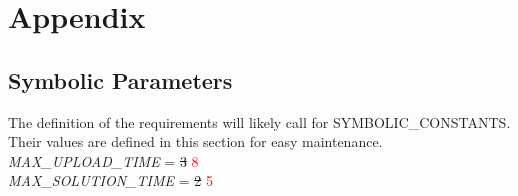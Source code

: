 \documentclass[11pt]{article}
\begin{document}
\newpage

\section{Appendix}

\subsection{Symbolic Parameters}

The definition of the requirements will likely call for SYMBOLIC\_CONSTANTS.
Their values are defined in this section for easy maintenance.\\

\noindent \emph{MAX\_UPLOAD\_TIME} = \sout{3} \textcolor{red}{8}\\
\emph{MAX\_SOLUTION\_TIME} = \sout{2} \textcolor{red}{5}
\end{document}
